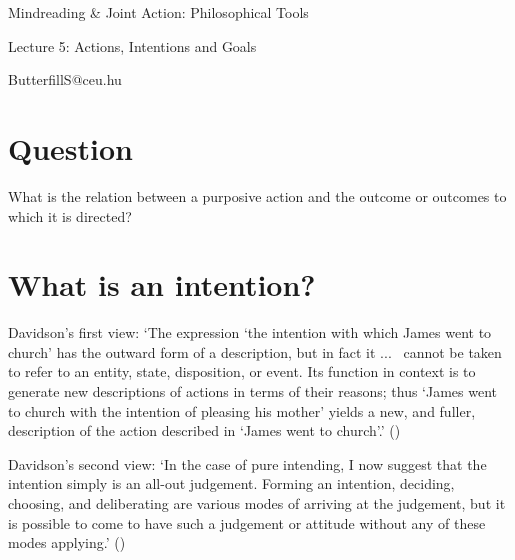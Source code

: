\documentclass[11pt]{extarticle}
\date{}
\begin{document}
\begin{multicols}{3}

\setlength\footnotesep{1em}









\begin{center}
{\Large
Mindreading \& Joint Action: Philosophical Tools}

Lecture 5: Actions, Intentions and Goals


ButterfillS@ceu.hu
\end{center}

\section{Question}
What is the relation between a purposive action and the outcome or outcomes to which it is directed?


\section{What is an intention?}

Davidson's first view: 
`The expression `the intention with which James went to church' has the outward form of a description, but in fact it
...\ %
 cannot be taken to refer to an entity, state, disposition, or event. Its function in context is to generate new descriptions of actions in terms of their reasons; thus `James went to church with the intention of pleasing his mother' yields a new, and fuller, description of the action described in `James went to church'.' (\citeyear[p.\ 690]{davidson:1963_orig}) %
 
Davidson's second view:
`In the case of pure intending, I now suggest that 
the intention simply is an all-out judgement. Forming an intention, deciding, choosing, and deliberating are various modes of arriving at the judgement, but it is possible to come to have such a judgement or attitude without any of these modes applying.' (\citeyear[p.\ 99]{Davidson:1978hy}) %


\end{multicols}
\end{document}

